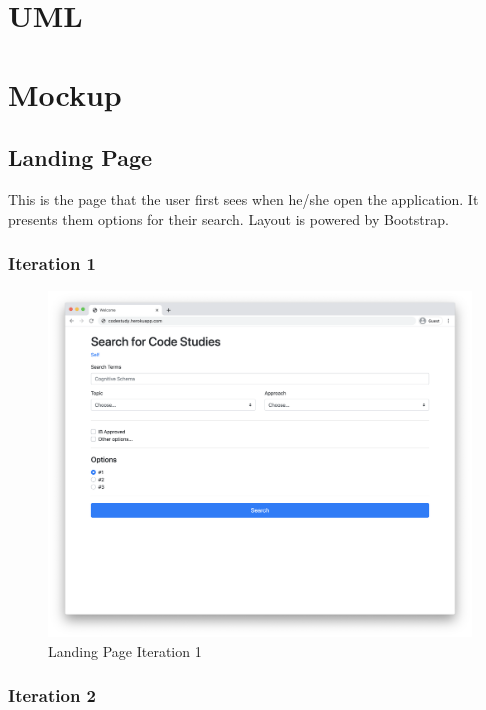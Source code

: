 \documentclass[
]{article}
\begin{document}
\hypertarget{uml}{%
\section{UML}\label{uml}}

\hypertarget{mockup}{%
\section{Mockup}\label{mockup}}

\hypertarget{landing-page}{%
\subsection{Landing Page}\label{landing-page}}

This is the page that the user first sees when he/she open the
application. It presents them options for their search. Layout is
powered by Bootstrap.\\

\hypertarget{iteration-1-1}{%
\subsubsection{Iteration 1}\label{iteration-1-1}}

\begin{figure}
\centering
\includegraphics{img/landing page iteration 1.png}
\caption{Landing Page Iteration 1}
\end{figure}

\hypertarget{iteration-2-1}{%
\subsubsection{Iteration 2}\label{iteration-2-1}}
\end{document}
